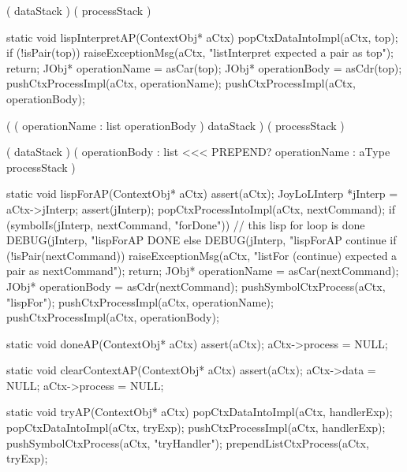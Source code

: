 \postDataStack
  ( dataStack )
\postProcessStack
  ( processStack )
\postConditions
\stopPostStack

\stopWord

\stoptyping

\startCCode
static void lispInterpretAP(ContextObj* aCtx) {
  popCtxDataIntoImpl(aCtx, top);
  if (!isPair(top)) {
    raiseExceptionMsg(aCtx,
      "listInterpret expected a pair as top");
    return;
  }
  JObj* operationName = asCar(top);
  JObj* operationBody = asCdr(top);
  pushCtxProcessImpl(aCtx, operationName);
  pushCtxProcessImpl(aCtx, operationBody);
}
\stopCCode

\starttyping

\startWord[lispInterpret]

\preDataStack
  (
    (
      operationName : list
      operationBody
    )
    dataStack 
  )
\preProcessStack
  (
    processStack
  )
\preConditions
\stopPreStack

\postDataStack
  ( dataStack )
\postProcessStack
  (
    operationBody : list <<< PREPEND?
    operationName : aType
    processStack
  )
\postConditions
\stopPostStack

\stopWord

\stoptyping

\startCCode
static void lispForAP(ContextObj* aCtx) {
  assert(aCtx);
  JoyLoLInterp *jInterp = aCtx->jInterp;
  assert(jInterp);
  popCtxProcessIntoImpl(aCtx, nextCommand);
  if (symbolIs(jInterp, nextCommand, "forDone")) {
    // this lisp for loop is done
    DEBUG(jInterp, "lispForAP DONE%
  } else {
    DEBUG(jInterp, "lispForAP continue%
    if (!isPair(nextCommand)) {
      raiseExceptionMsg(aCtx,
        "listFor (continue) expected a pair as nextCommand");
      return;
    }
    JObj* operationName = asCar(nextCommand);
    JObj* operationBody = asCdr(nextCommand);
    pushSymbolCtxProcess(aCtx, "lispFor");
    pushCtxProcessImpl(aCtx, operationName);
    pushCtxProcessImpl(aCtx, operationBody);
  }
}
\stopCCode

\startCCode
static void doneAP(ContextObj* aCtx) {
  assert(aCtx);
  aCtx->process = NULL;
}
\stopCCode

\startCCode
static void clearContextAP(ContextObj* aCtx) {
  assert(aCtx);
  aCtx->data    = NULL;
  aCtx->process = NULL;
}
\stopCCode

\startCCode
static void tryAP(ContextObj* aCtx) {
  popCtxDataIntoImpl(aCtx, handlerExp);
  popCtxDataIntoImpl(aCtx, tryExp);
  pushCtxProcessImpl(aCtx, handlerExp);
  pushSymbolCtxProcess(aCtx, "tryHandler");
  prependListCtxProcess(aCtx, tryExp);
}
\stopCCode

